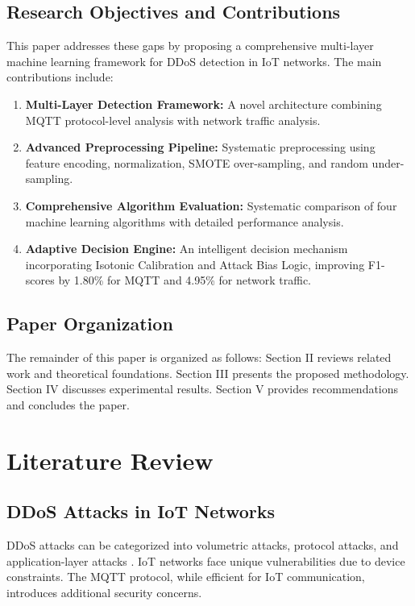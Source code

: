 \documentclass[conference]{IEEEtran}
\begin{document}
\subsection{Research Objectives and Contributions}

This paper addresses these gaps by proposing a comprehensive multi-layer machine learning framework for DDoS detection in IoT networks. The main contributions include:

\begin{enumerate}
\item \textbf{Multi-Layer Detection Framework:} A novel architecture combining MQTT protocol-level analysis with network traffic analysis.

\item \textbf{Advanced Preprocessing Pipeline:} Systematic preprocessing using feature encoding, normalization, SMOTE over-sampling, and random under-sampling.

\item \textbf{Comprehensive Algorithm Evaluation:} Systematic comparison of four machine learning algorithms with detailed performance analysis.

\item \textbf{Adaptive Decision Engine:} An intelligent decision mechanism incorporating Isotonic Calibration and Attack Bias Logic, improving F1-scores by 1.80\% for MQTT and 4.95\% for network traffic.
\end{enumerate}


\subsection{Paper Organization}

The remainder of this paper is organized as follows: Section II reviews related work and theoretical foundations. Section III presents the proposed methodology. Section IV discusses experimental results. Section V provides recommendations and concludes the paper.

\section{Literature Review}

\subsection{DDoS Attacks in IoT Networks}

DDoS attacks can be categorized into volumetric attacks, protocol attacks, and application-layer attacks \cite{ddos_taxonomy}. IoT networks face unique vulnerabilities due to device constraints. The MQTT protocol, while efficient for IoT communication, introduces additional security concerns.
\end{document}
